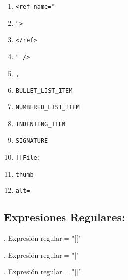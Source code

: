 \documentclass[a4paper,11pt]{article}
\begin{document}
\begin{center}
\begin{enumerate}
\item	\begin{verbatim}<ref name="\end{verbatim} 
\item	\begin{verbatim}">\end{verbatim}
\item	\begin{verbatim}</ref>\end{verbatim} 
\item	\begin{verbatim}" />\end{verbatim} 
\item	\begin{verbatim}, \end{verbatim}
\item	\begin{verbatim}BULLET_LIST_ITEM\end{verbatim} 
\item	\begin{verbatim}NUMBERED_LIST_ITEM\end{verbatim} 
\item	\begin{verbatim}INDENTING_ITEM\end{verbatim} 
\item	\begin{verbatim}SIGNATURE\end{verbatim}
\item	\begin{verbatim}[[File:\end{verbatim}
\item	\begin{verbatim}thumb\end{verbatim}
\item	\begin{verbatim}alt=\end{verbatim}
\end{enumerate}
\end{center}

\subsection{Expresiones Regulares:}


.
Expresi\'on regular = "[["

.
Expresi\'on regular = "|"


.
Expresi\'on regular = "]]"
\end{document}
